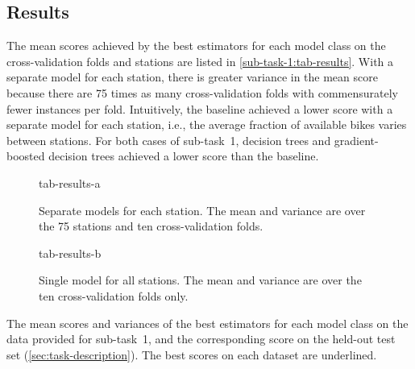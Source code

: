 \subsection{Results}
\label{sec:sub-task-1:results}

The mean scores achieved by the best estimators for each model class on the
cross-validation folds and stations are listed in \cref{sub-task-1:tab-results}.
With a separate model for each station, there is greater variance in the mean score
because there are 75 times as many cross-validation folds with commensurately fewer
instances per fold.
Intuitively, the baseline achieved a lower score with a separate model for each
station, i.e., the average fraction of available bikes varies between stations.
For both cases of sub-task~1, decision trees and gradient-boosted decision trees
achieved a lower score than the baseline.

\begin{table}
  \centering
  \begin{subfigure}{0.6\textwidth}
    \centering
    {tab-results-a}
    \caption{
      Separate models for each station.
      The mean and variance are over the 75 stations and ten cross-validation folds.
    }
    \label{sub-task-1:tab-results-a}
  \end{subfigure}
  \subfigurespace
  \begin{subfigure}{0.6\textwidth}
    \centering
    {tab-results-b}
    \caption{
      Single model for all stations.
      The mean and variance are over the ten cross-validation folds only.
    }
    \label{sub-task-1:tab-results-b}
  \end{subfigure}
  \caption{ The mean scores and variances of the best estimators for each
    model class on the data provided for sub-task~1, and the corresponding score on the
    held-out test set (\cref{sec:task-description}).
    The best scores on each dataset are underlined.
  }
  \label{sub-task-1:tab-results}
\end{table}

